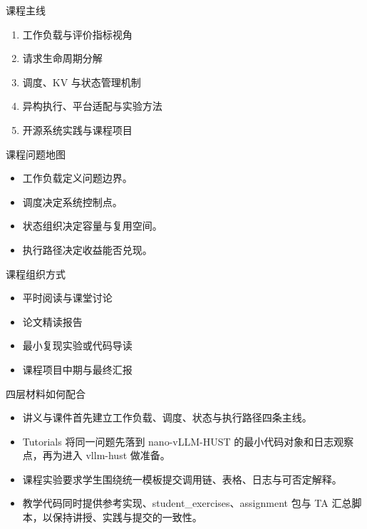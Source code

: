 \begin{frame}{课程主线}
  \begin{enumerate}
    \item 工作负载与评价指标视角
    \item 请求生命周期分解
    \item 调度、KV 与状态管理机制
    \item 异构执行、平台适配与实验方法
    \item 开源系统实践与课程项目
  \end{enumerate}
\end{frame}

\begin{frame}{课程问题地图}
  \begin{itemize}
    \item 工作负载定义问题边界。
    \item 调度决定系统控制点。
    \item 状态组织决定容量与复用空间。
    \item 执行路径决定收益能否兑现。
  \end{itemize}
\end{frame}

\begin{frame}{课程组织方式}
  \begin{itemize}
    \item 平时阅读与课堂讨论
    \item 论文精读报告
    \item 最小复现实验或代码导读
    \item 课程项目中期与最终汇报
  \end{itemize}
\end{frame}

\begin{frame}{四层材料如何配合}
  \begin{itemize}
    \item 讲义与课件首先建立工作负载、调度、状态与执行路径四条主线。
    \item Tutorials 将同一问题先落到 nano-vLLM-HUST 的最小代码对象和日志观察点，再为进入 vllm-hust 做准备。
    \item 课程实验要求学生围绕统一模板提交调用链、表格、日志与可否定解释。
    \item 教学代码同时提供参考实现、student\_exercises、assignment 包与 TA 汇总脚本，以保持讲授、实践与提交的一致性。
  \end{itemize}
\end{frame}

